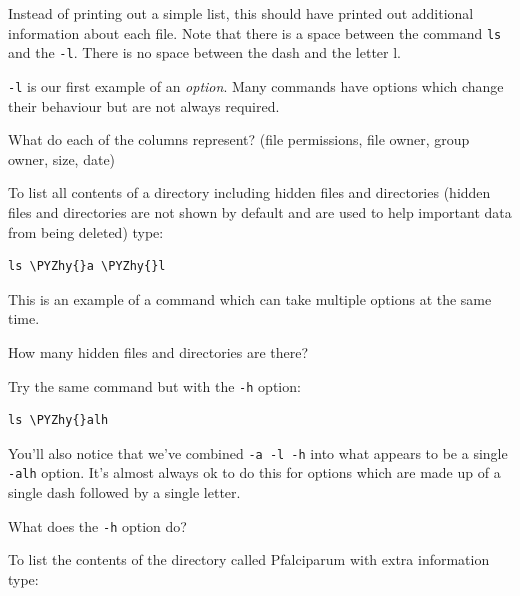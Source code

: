 \documentclass[11pt]{article}
\makeatletter
\def\PYZhy{\char`\-}
\newcommand{\boxspacing}{\kern\kvtcb@left@rule\kern\kvtcb@boxsep}
\newcommand{\prompt}[4]{
       \ttfamily\llap{{\color{#2}\LARGE\faKeyboardO\hspace{3pt}#4}}\vspace{-\baselineskip}
    }
\makeatother
\begin{document}
    Instead of printing out a simple list, this should have printed out
additional information about each file. Note that there is a space
between the command \texttt{ls} and the \texttt{-l}. There is no space
between the dash and the letter l.

\texttt{-l} is our first example of an \textit{option}. Many commands have
options which change their behaviour but are not always required.

What do each of the columns represent? (file permissions, file owner,
group owner, size, date)

    To list all contents of a directory including hidden files and
directories (hidden files and directories are not shown by default and
are used to help important data from being deleted) type:

    \begin{tcolorbox}[breakable, size=fbox, boxrule=1pt, pad at break*=1mm,colback=cellbackground, colframe=cellborder]
\prompt{In}{incolor}{ }{\boxspacing}
\begin{Verbatim}[commandchars=\\\{\}]
ls \PYZhy{}a \PYZhy{}l
\end{Verbatim}
\end{tcolorbox}

    This is an example of a command which can take multiple options at the
same time.

How many hidden files and directories are there?

    Try the same command but with the \texttt{-h} option:

    \begin{tcolorbox}[breakable, size=fbox, boxrule=1pt, pad at break*=1mm,colback=cellbackground, colframe=cellborder]
\prompt{In}{incolor}{ }{\boxspacing}
\begin{Verbatim}[commandchars=\\\{\}]
ls \PYZhy{}alh
\end{Verbatim}
\end{tcolorbox}

    You'll also notice that we've combined \texttt{-a\ -l\ -h} into what
appears to be a single \texttt{-alh} option. It's almost always ok to do
this for options which are made up of a single dash followed by a single
letter.

What does the \texttt{-h} option do?

    To list the contents of the directory called Pfalciparum with extra
information type:
\end{document}
